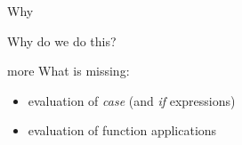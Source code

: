 \begin{frame}{Why}

\vspace{40pt}\hspace{80pt}Why do we do this?

\end{frame}


\begin{frame}{more}
What is missing:
\pause
\begin{itemize}
  \item evaluation of {\em case} (and {\em if} expressions)
  \item evaluation of function applications
\end{itemize}
\end{frame}


